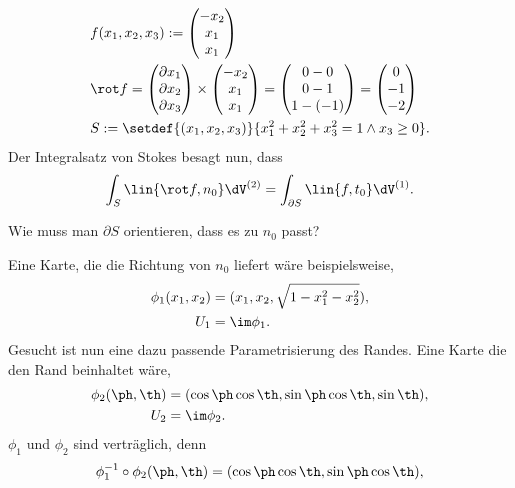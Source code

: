 \begin{bsp}
\label{bsp:4.61}
\begin{align*}
&f(x_1,x_2,x_3) := \begin{pmatrix}
-x_2\\x_1\\x_1
\end{pmatrix}\\
&\rot f = \begin{pmatrix}
\partial x_1\\\partial x_2\\\partial x_3
\end{pmatrix}\times\begin{pmatrix}
-x_2\\x_1\\x_1
\end{pmatrix}
= \begin{pmatrix}
0 - 0\\ 0-1\\ 1-(-1)
\end{pmatrix}
= \begin{pmatrix}
0\\-1\\-2
\end{pmatrix}\\
&S:= \setdef{(x_1,x_2,x_3)}{x_1^2+x_2^2+x_3^2 = 1 \land x_3\ge 0}.
\end{align*}
Der Integralsatz von Stokes besagt nun, dass
\begin{align*}
\int_S \lin{\rot f, n_0}\dV^{(2)} = \int_{\partial S} \lin{f,t_0} \dV^{(1)}.
\end{align*}
\begin{bemn}[Frage]
Wie muss man $\partial S$ orientieren, dass es zu $n_0$ passt?
\end{bemn}
Eine Karte, die die Richtung von $n_0$ liefert wäre beispielsweise,
\begin{align*}
\phi_1(x_1,x_2) &= (x_1,x_2,\sqrt{1-x_1^2-x_2^2}),\\
U_1 &= \im\phi_1.
\end{align*}
Gesucht ist nun eine dazu passende Parametrisierung des Randes. Eine Karte die
den Rand beinhaltet wäre,
\begin{align*}
\phi_2(\ph,\th) &= (\cos\ph\cos\th,\sin\ph\cos\th,\sin\th),\\
U_2 &= \im\phi_2.
\end{align*}
$\phi_1$ und $\phi_2$ sind verträglich, denn
\begin{align*}
&\phi_1^{-1}\circ\phi_2(\ph,\th) = (\cos\ph\cos\th,\sin\ph\cos\th),\\

\end{align*}
\end{bsp}

